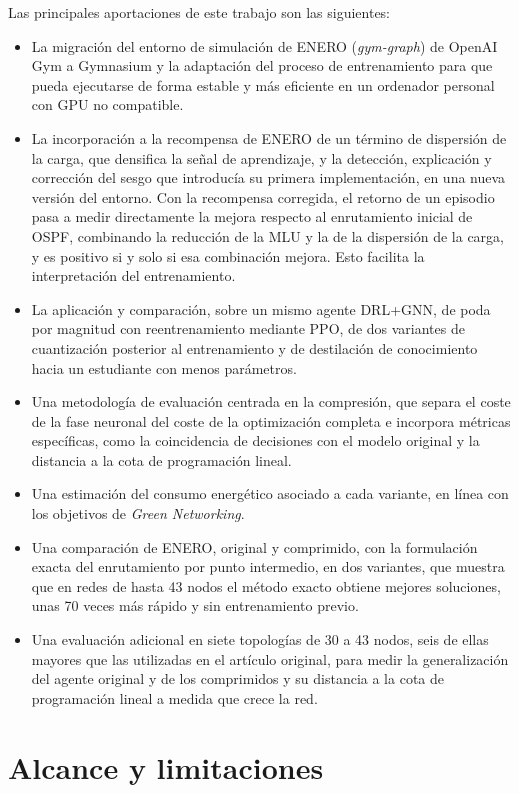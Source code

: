 Las principales aportaciones de este trabajo son las siguientes:

\begin{itemize}
	\item La migración del entorno de simulación de ENERO (\textit{gym-graph}) de OpenAI Gym a Gymnasium y la adaptación del proceso de entrenamiento para que pueda ejecutarse de forma estable y más eficiente en un ordenador personal con GPU no compatible. 
	\item La incorporación a la recompensa de ENERO de un término de dispersión de la carga, que densifica la señal de aprendizaje, y la detección, explicación y corrección del sesgo que introducía su primera implementación, en una nueva versión del entorno. Con la recompensa corregida, el retorno de un episodio pasa a medir directamente la mejora respecto al enrutamiento inicial de OSPF, combinando la reducción de la MLU y la de la dispersión de la carga, y es positivo si y solo si esa combinación mejora. Esto facilita la interpretación del entrenamiento.
	\item La aplicación y comparación, sobre un mismo agente DRL+GNN, de poda por magnitud con reentrenamiento mediante PPO, de dos variantes de cuantización posterior al entrenamiento y de destilación de conocimiento hacia un estudiante con menos parámetros.
	\item Una metodología de evaluación centrada en la compresión, que separa el coste de la fase neuronal del coste de la optimización completa e incorpora métricas específicas, como la coincidencia de decisiones con el modelo original y la distancia a la cota de programación lineal.
	\item Una estimación del consumo energético asociado a cada variante, en línea con los objetivos de \textit{Green Networking}.
	\item Una comparación de ENERO, original y comprimido, con la formulación exacta del enrutamiento por punto intermedio, en dos variantes, que muestra que en redes de hasta 43 nodos el método exacto obtiene mejores soluciones, unas 70 veces más rápido y sin entrenamiento previo.
	\item Una evaluación adicional en siete topologías de 30 a 43 nodos, seis de ellas mayores que las utilizadas en el artículo original, para medir la generalización del agente original y de los comprimidos y su distancia a la cota de programación lineal a medida que crece la red.
\end{itemize}

\section{Alcance y limitaciones}\label{sec:int_alcance}

